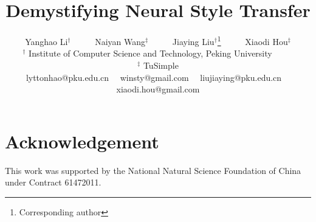 \documentclass{article}
\begin{document}
\title{Demystifying Neural Style Transfer}

\author{Yanghao Li$^\dagger$~~~~~ Naiyan Wang$^\ddagger$~~~~~ Jiaying Liu$^\dagger$\thanks{Corresponding author}~~~~~ Xiaodi Hou$^\ddagger$\\
$^\dagger$ Institute of Computer Science and Technology, Peking University~~~~~\\
$^\ddagger$ TuSimple\\
{ lyttonhao@pku.edu.cn}~~{ winsty@gmail.com}~~
{ liujiaying@pku.edu.cn}~~
{ xiaodi.hou@gmail.com}
}

\maketitle
{}

\graphicspath{{figures/}}







% 



% 






\section*{Acknowledgement} This work was supported by the National Natural Science Foundation of China under Contract 61472011.



{


}
\end{document}
